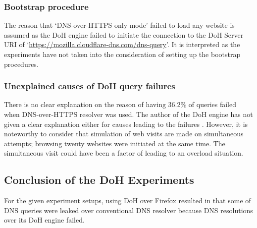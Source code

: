 \subsubsection{Bootstrap procedure}\label{bootstrap}
The reason that `DNS-over-HTTPS only mode' failed to load any website is assumed as the DoH engine failed to initiate the connection to the DoH Server URI of `\url{https://mozilla.cloudflare-dns.com/dns-query}'. It is interpreted as the experiments have not taken into the consideration of setting up the bootstrap procedures.

\subsubsection{Unexplained causes of DoH query failures}
There is no clear explanation on the reason of having 36.2\% of queries failed when DNS-over-HTTPS resolver was used.
The author of the DoH engine has not given a clear explanation either for causes leading to the failures \cite{daniel-doh}.
However, it is noteworthy to consider that simulation of web visits are made on simultaneous attempts; browsing twenty websites were initiated at the same time.
The simultaneous visit could have been a factor of leading to an overload situation.

\subsection{Conclusion of the DoH Experiments}
For the given experiment setups, using DoH over Firefox resulted in that some of DNS queries were leaked over conventional DNS resolver because DNS resolutions over its DoH engine failed.